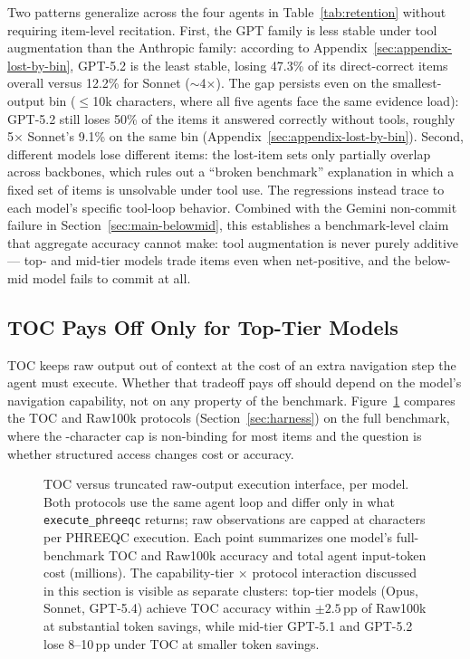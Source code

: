\documentclass{article}
\begin{document}
Two patterns generalize across the four agents in Table~\ref{tab:retention} without requiring item-level recitation. First, the GPT family is less stable under tool augmentation than the Anthropic family: according to Appendix~\ref{sec:appendix-lost-by-bin}, GPT-5.2 is the least stable, losing 47.3\% of its direct-correct items overall versus 12.2\% for Sonnet ($\sim$4$\times$). The gap persists even on the smallest-output bin ($\le$10k characters, where all five agents face the same evidence load): GPT-5.2 still loses 50\% of the items it answered correctly without tools, roughly 5$\times$ Sonnet's 9.1\% on the same bin (Appendix~\ref{sec:appendix-lost-by-bin}). Second, different models lose different items: the lost-item sets only partially overlap across backbones, which rules out a ``broken benchmark'' explanation in which a fixed set of items is unsolvable under tool use. The regressions instead trace to each model's specific tool-loop behavior. Combined with the Gemini non-commit failure in Section~\ref{sec:main-belowmid}, this establishes a benchmark-level claim that aggregate accuracy cannot make: tool augmentation is never purely additive --- top- and mid-tier models trade items even when net-positive, and the below-mid model fails to commit at all.

\subsection{TOC Pays Off Only for Top-Tier Models}
\label{sec:toc}

TOC keeps raw output out of context at the cost of an extra navigation step the agent must execute. Whether that tradeoff pays off should depend on the model's navigation capability, not on any property of the benchmark. Figure~\ref{fig:toc-raw} compares the TOC and Raw100k protocols (Section~\ref{sec:harness}) on the full benchmark, where the \RawCapChars-character cap is non-binding for most items and the question is whether structured access changes cost or accuracy.

\begin{figure}[t]
\centering

\caption{TOC versus truncated raw-output execution interface, per model. Both protocols use the same agent loop and differ only in what \texttt{execute\_phreeqc} returns; raw observations are capped at \RawCapChars{} characters per PHREEQC execution. Each point summarizes one model's full-benchmark TOC and Raw100k accuracy and total agent input-token cost (millions). The capability-tier $\times$ protocol interaction discussed in this section is visible as separate clusters: top-tier models (Opus, Sonnet, GPT-5.4) achieve TOC accuracy within $\pm 2.5$\,pp of Raw100k at substantial token savings, while mid-tier GPT-5.1 and GPT-5.2 lose 8--10\,pp under TOC at smaller token savings.}
\label{fig:toc-raw}
\end{figure}
\end{document}
